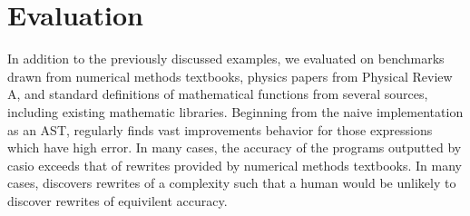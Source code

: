 \documentclass[paper.tex]{subfiles}
\begin{document}
\section{Evaluation}


In addition to the previously discussed examples,
we evaluated \casio on benchmarks drawn from
numerical methods textbooks,
physics papers from Physical Review A,
and standard definitions of mathematical functions from several sources,
including existing mathematic libraries.
Beginning from the naive implementation as an AST,
\casio regularly finds vast improvements behavior for those expressions which have high error.
In many cases, the accuracy of the programs outputted by casio 
exceeds that of rewrites provided by numerical methods textbooks.
In many cases, \casio discovers rewrites of a complexity 
such that a human would be unlikely to discover rewrites of equivilent accuracy.
\end{document}
